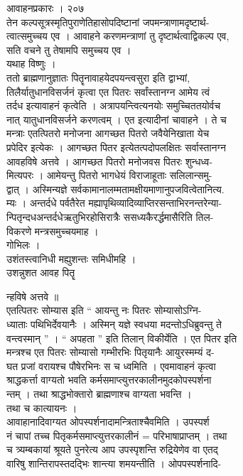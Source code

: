 \documentclass[11pt, openany]{book}
\begin{document}
{{{{{{{{{{{ }{ आवाहनप्रकारः । २०७}{\\
तेन कल्पसूत्रस्मृतिपुराणेतिहासोपदिष्टानां जपमन्त्राणामदृष्टार्थ-\\
त्वात्समुच्चय एव । आवाहने करणमन्त्राणां तु दृष्टार्थत्वाद्विकल्प एव,\\
सति वचने तु तेषामपि समुच्चय एव ।\\
यथाह विष्णुः ।\\
ततो ब्राह्मणानुज्ञातः पितॄनावाहयेदपयन्त्वसुरा इति द्वाभ्यां,\\
तिलैर्यातुधानविसर्जनं कृत्वा एत पितरः सर्वांस्तानग्न आमेय त्वं\\
तर्दध इत्यावाहनं कृत्वेति । अत्रापयन्त्वित्यनयोः समुच्चिततयोर्वच\\
नात् यातुधानविसर्जने करणत्वम् । एत इत्यादीनां चावाहने । ते च\\
मन्त्राः एतत्पितरो मनोजना आगच्छत पितरो जवैयेनिखाता येच\\
प्रपेदिर इत्येकः । आगच्छत पितर इत्येतत्पदोपलक्षितः सर्वास्तानग्न\\
आवहविषे अत्तवे । आगच्छत पितरो मनोजवस पितरः शुन्धध्व-\\
मित्यपरः । आमेयन्तु पितरो भागधेयं विराजाहूताः सलिलान्समु-\\
द्वात् । अस्मिन्यज्ञे सर्वकामानालम्मतामक्षीयमाणानुपजवित्वेतानित्य.\\
म्यः । अन्तर्दधे पर्वतैरेत मह्यापृथिव्यादिव्याप्तिरसन्ताभिरनन्तरेन्या-\\
न्पितृन्दधअन्तर्दधेऋतुभिरहोसिरात्रैः ससध्यकैरर्द्धमासैरिति तिल-\\
विकरणे मन्त्रसमुच्चयमाह ।\\
गोभिलः ।\\
उशंतस्त्वानिधी मह्युशन्तः समिधीमहि ।\\
उशन्नुशत आवह पि}{तॄ}{न्हविषे अत्तवे ॥\\
एतत्पितरः सोम्यास इति `` आयन्तु नः पितरः सोम्यासोऽग्नि-\\
ध्याताः पथिभिर्देवयानैः । अस्मिन् यज्ञे स्वधया मदन्तोऽधिब्रुवन्तु ते\\
वन्त्वस्मान् '' । `` अपहता '' इति तिलान् विकीर्येति । एत पितर इति\\
मन्त्रश्च एत पितरः सोम्यासो गम्भीरभिः पितृयानैः आयुरस्मम्यं द-\\
घत प्रजां वरायश्च पौषेरभिनः स च ध्वमिति । एवमावाहनं कृत्वा\\
श्राद्धकर्त्ता वाग्यतो भवति कर्मसमाप्त्युत्तरकालीनमुदकोपस्पर्शना\\
न्तम् । तथा श्राद्धभोक्तारो ब्राह्मणाश्च वाग्यता भवन्ति ।\\
तथा च कात्यायनः ।\\
आवाहानादिवाग्यत ओपस्पर्शनादामन्त्रिताश्चैवमिति । उपस्पर्श\\
नं चापां तच्च पितृकर्मसमाप्त्युत्तरकालीनं = परिभाषाप्राप्तम् । तथा\\
च त्र्यम्बकायां श्रूयते पुनरेत्य आप उपस्पृशन्ति रुद्रियेणेव वा एतद्\\
वारिषु शान्तिरापस्तदद्भिः शान्त्या शमयन्तीति । ओपपस्पर्शनादि-

}}}}}}}}}}}
\end{document}
